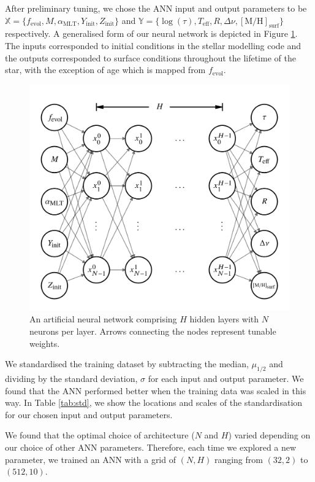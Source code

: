 \documentclass[a4paper,fleqn,usenatbib]{mnras}
\newcommand{\dnu}{\ensuremath{\Delta\nu}}
\newcommand{\metallicity}{\ensuremath{[\mathrm{M}/\mathrm{H}]}}
\newcommand{\teff}{\ensuremath{T_\mathrm{eff}}}
\newcommand{\mlt}{\ensuremath{{\alpha_\mathrm{MLT}}}}
\begin{document}
After preliminary tuning, we chose the ANN input and output parameters to be $\boldsymbol{\mathbb{X}} = \{f_\mathrm{evol}, M, \mlt, Y_\mathrm{init}, Z_\mathrm{init}\}$ and $\boldsymbol{\mathbb{Y}} = \{\log(\tau), \teff, R, \dnu, \metallicity_\mathrm{surf}\}$ respectively. A generalised form of our neural network is depicted in Figure \ref{fig:net}. The inputs corresponded to initial conditions in the stellar modelling code and the outputs corresponded to surface conditions throughout the lifetime of the star, with the exception of age which is mapped from $f_\mathrm{evol}$.

\begin{figure}
    \includegraphics[width=\linewidth]{figures/network_10.png}
    \caption{An artificial neural network comprising $H$ hidden layers with $N$ neurons per layer. Arrows connecting the nodes represent tunable weights.}
    \label{fig:net}
\end{figure}

We standardised the training dataset by subtracting the median, $\mu_{1/2}$ and dividing by the standard deviation, $\sigma$ for each input and output parameter. We found that the ANN performed better when the training data was scaled in this way. In Table \ref{tab:std}, we show the locations and scales of the standardisation for our chosen input and output parameters.

We found that the optimal choice of architecture ($N$ and $H$) varied depending on our choice of other ANN parameters. Therefore, each time we explored a new parameter, we trained an ANN with a grid of $(N,H)$ ranging from $(32, 2)$ to $(512, 10)$.
\end{document}

